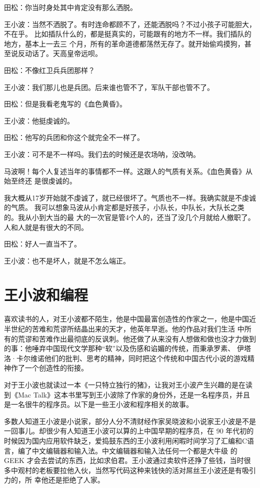 田松：你当时身处其中肯定没有那么洒脱。


王小波：当然不洒脱了。有时连命都顾不了，还能洒脱吗？不过小孩子可能胆大，不在乎。
比如插队什么的，都是挺真实的，可能跟有的地方不一样。我们插队的地方，基本上一去三
个月，所有的革命道德都荡然无存了。就开始偷鸡摸狗，甚至说反动话了。天高皇帝远呗。



田松：不像红卫兵兵团那样？


王小波：我们那儿也是兵团。后来谁也管不了，军队干部也管不了。


田松：但是我看老鬼写的《血色黄昏》。


王小波：他挺虔诚的。


田松：他写的兵团和你这个就完全不一样了。


王小波：可不是不一样吗。我们去的时候还是农场呐，没改呐。


马波啊！每个人复述当年的事情都不一样。这跟人的气质有关系。《血色黄昏》从始至终还
是很虔诚的。


我大概从17岁开始就不虔诚了，就已经很坏了。气质也不一样。我确实就是不虔诚的气质。
我可以想象马波从小肯定都是好孩子，小队长，中队长，大队长之类的。我从小到大当的最
大的一次官是管4个人的，还当了没几个月就给人撤职了。人和人就是有很大的不同。


田松：好人一直当不了。


王小波：也不是坏人，就是不怎么端正。


\chapter{王小波和编程}

喜欢读书的人，对王小波都不陌生，他是中国最富创造性的作家之一，他是中国近半世纪的苦难和荒谬所结晶出来的天才，他英年早逝。他的作品对我们生活 中所有的荒谬和苦难作出最彻底的反讽刺。他还做了从来没有人想做和做也没才力做到的事：他唾弃中国现代文学那种“软”以及伤感和谄媚的传统，而秉承罗素、 伊塔洛·卡尔维诺他们的批判、思考的精神，同时把这个传统和中国古代小说的游戏精神作了一个创造性的衔接。

对于王小波也就读过一本《一只特立独行的猪》，让我对王小波产生兴趣的是在读到《Mac Talk》这本书里写到王小波除了作家的身份外，还是一名程序员，并且是一名很牛的程序员。以下是一些王小波和程序相关的故事。

 

多数人知道王小波是小说家，部分人分不清财经作家吴晓波和小说家王小波是不是一回事儿。却很少有人知道王小波可以算的上中国早期的程序员，在 90 年代初的时候因为国内应用软件缺乏，爱捣鼓东西的王小波利用闲暇时间学习了汇编和C语言，编了中文编辑器和输入法。中文编辑器和输入法任何一个都是大牛级 的 GEEK 才会去尝试的东西，比如求伯君。王小波通过卖软件还挣了些钱，当时很多中观村的老板要拉他入伙，当然写代码这种来钱快的活对屌丝王小波还是有吸引力的，所 幸他还是拒绝了人家。

